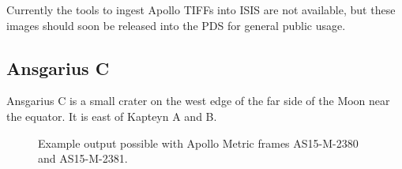 Currently the tools to ingest Apollo TIFFs into ISIS are not
available, but these images should soon be released into the PDS for
general public usage.

\subsection{Ansgarius C}


Ansgarius C is a small crater on the west edge of the far side of the
Moon near the equator. It is east of Kapteyn A and B.

\begin{figure}[h!]
\centering
  \hfil
\caption{Example output possible with Apollo Metric frames AS15-M-2380 and AS15-M-2381.}
\label{fig:metric_example}
\end{figure}

